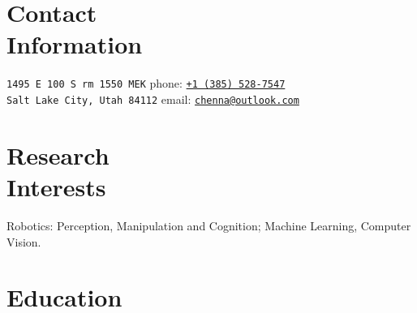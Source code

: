 \documentclass[letterpaper, margin, line]{resume}
\begin{document}
\author{Kautilya Chenna}

\begin{resume}

    \section{\mysidestyle Contact\\Information}

    \texttt{1495 E 100 S rm 1550 MEK}                            \hfill phone: \texttt{\href{tel:13855287547}{+1 (385) 528-7547}}          \vspace{0mm}\\\vspace{0mm}%
    \texttt{Salt Lake City, Utah 84112}                          \hfill email: \texttt{\href{mailto:chenna@outlook.com}{chenna@outlook.com}}       \vspace{-0.5mm}%

    \section{\mysidestyle Research\\Interests}

    Robotics: Perception, Manipulation and Cognition; Machine Learning, Computer Vision.
    \vspace{1pt}

    \section{\mysidestyle Education}


\end{resume}
\end{document}
